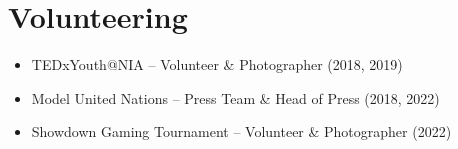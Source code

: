 \documentclass[11pt,a4paper]{article}
\begin{document}
\section*{Volunteering}
\begin{itemize}[leftmargin=*]
    \item TEDxYouth@NIA – Volunteer \& Photographer (2018, 2019)
    \item Model United Nations – Press Team \& Head of Press (2018, 2022)
    \item Showdown Gaming Tournament – Volunteer \& Photographer (2022)
\end{itemize}
\end{document}

